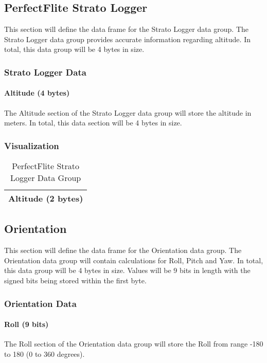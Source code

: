\documentclass{article}
\begin{document}
 \pagebreak
 
  \subsection{PerfectFlite Strato Logger}
  This section will define the data frame for the Strato Logger data group. The Strato Logger data group provides accurate information regarding altitude. In total, this data group will be 4 bytes in size.
  \subsubsection{Strato Logger Data}
  \paragraph{Altitude (4 bytes)}
  The Altitude section of the Strato Logger data group will store the altitude in meters. In total, this data section will be 4 bytes in size.
  
  \subsubsection{Visualization}
  \begin{table}[H]
  \centering
  \caption{PerfectFlite Strato Logger Data Group}
  \label{my-label}
  \begin{tabular}{|l|}
  \hline
Altitude (2 bytes) \\ \hline
 \end{tabular}
 \end{table}
  
 \pagebreak
  
  \subsection{Orientation}
  
  This section will define the data frame for the Orientation data group. The Orientation data group will contain calculations for Roll, Pitch and Yaw. In total, this data group will be 4 bytes in size. Values will be 9 bits in length with the signed bits being stored within the first byte. 
  \subsubsection{Orientation Data}
  \paragraph{Roll (9 bits)}
  The Roll section of the Orientation data group will store the Roll from range -180 to 180 (0 to 360 degrees).
\end{document}
